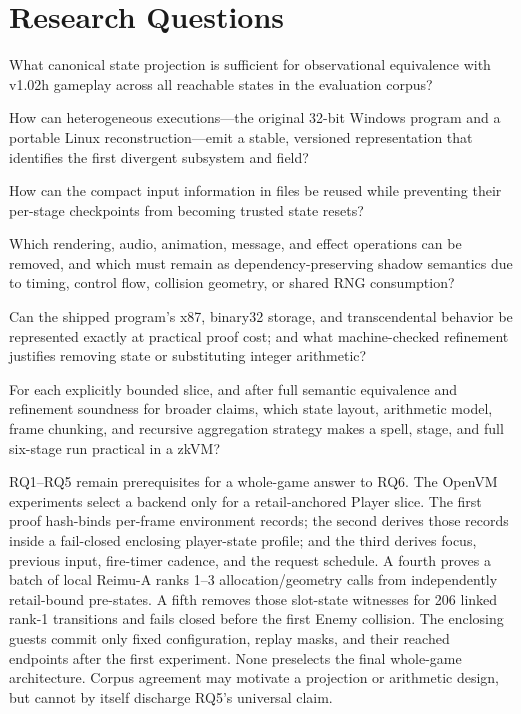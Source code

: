 \section{Research Questions}

\begin{description}[style=nextline,leftmargin=0pt]
  \item[RQ1: Semantic boundary.]
  What canonical state projection is sufficient for observational equivalence
  with v1.02h gameplay across all reachable states in the evaluation corpus?

  \item[RQ2: Differential diagnosis.]
  How can heterogeneous executions---the original 32-bit Windows program and a
  portable Linux reconstruction---emit a stable, versioned representation that
  identifies the first divergent subsystem and field?

  \item[RQ3: Untrusted replay witnesses.]
  How can the compact input information in  files be reused while
  preventing their per-stage checkpoints from becoming trusted state resets?

  \item[RQ4: Semantics-preserving slicing.]
  Which rendering, audio, animation, message, and effect operations can be
  removed, and which must remain as dependency-preserving shadow semantics due
  to timing, control flow, collision geometry, or shared RNG consumption?

  \item[RQ5: Arithmetic and slicing soundness.]
  Can the shipped program's x87, binary32 storage, and transcendental behavior
  be represented exactly at practical proof cost; and what machine-checked
  refinement justifies removing state or substituting integer arithmetic?

  \item[RQ6: Proof decomposition.]
  For each explicitly bounded slice, and after full semantic equivalence and
  refinement soundness for broader claims, which state layout, arithmetic
  model, frame chunking, and recursive aggregation strategy makes a spell,
  stage, and full six-stage run practical in a zkVM?
\end{description}

RQ1--RQ5 remain prerequisites for a whole-game answer to RQ6.  The OpenVM
experiments select a backend only for a retail-anchored Player slice.
The first proof hash-binds per-frame environment records; the second derives
those records inside a fail-closed enclosing player-state profile; and the
third derives focus, previous input, fire-timer cadence, and the
 request schedule.  A fourth proves a batch of local
Reimu-A ranks 1--3 allocation/geometry calls from independently retail-bound
pre-states.  A fifth removes those slot-state witnesses for 206 linked
rank-1 transitions and fails closed before the first Enemy collision.  The
enclosing guests commit only fixed configuration,
replay masks, and their reached endpoints after the first experiment.  None
preselects the final whole-game architecture.  Corpus agreement may motivate a
projection or arithmetic design, but cannot by itself discharge RQ5's
universal claim.

